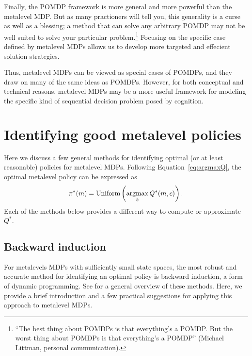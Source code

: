 Finally, the POMDP framework is more general and more powerful than the metalevel MDP. But as many practioners will tell you, this generality is a curse as well as a blessing; a method that can solve any arbitrary POMDP may not be well suited to solve your particular problem.\footnote{%
  ``The best thing about POMDPs is that everything's a POMDP. But the worst thing about POMDPs is that everything's a POMDP'' (Michael Littman, personal communication).
} Focusing on the specific case defined by metalevel MDPs allows us to develop more targeted and effecient solution strategies.

Thus, metalevel MDPs can be viewed as special cases of POMDPs, and they draw on many of the same ideas as POMDPs. However, for both conceptual and technical reasons, metalevel MDPs may be a more useful framework for modeling the specific kind of sequential decision problem posed by cognition.


\section{Identifying good metalevel policies}\label{sec:computing}

Here we discuss a few general methods for identifying optimal (or at least reasonable) policies for metalevel MDPs. Following Equation~\ref{eq:argmaxQ}, the optimal metalevel policy can be expressed as
%
\begin{equation}
  \pi^*(m) = \text{Uniform}\left(\operatorname*{argmax}_b Q^*(m, c)\right).
\end{equation}
Each of the methods below provides a different way to compute or approximate $Q^*$.

\subsection{Backward induction}\label{sec:backinduct}

For metalevels MDPs with sufficiently small state spaces, the most robust and accurate method for identifying an optimal policy is backward induction, a form of dynamic programming. See \citet{puterman2014markov} for a general overview of these methods. Here, we provide a brief introduction and a few practical suggestions for applying this approach to metalevel MDPs.

